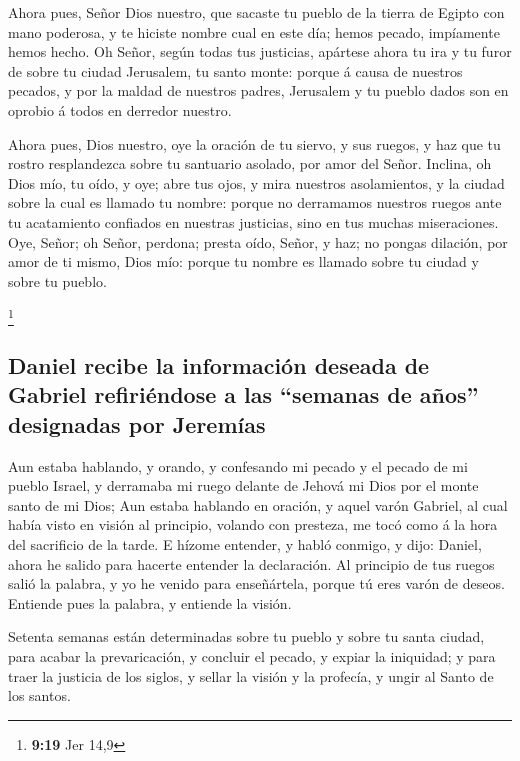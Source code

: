  Ahora pues, Señor Dios nuestro, que sacaste tu pueblo de
la tierra de Egipto con mano poderosa, y te hiciste nombre cual en este
día; hemos pecado, impíamente hemos hecho.  Oh Señor, según
todas tus justicias, apártese ahora tu ira y tu furor de sobre tu ciudad
Jerusalem, tu santo monte: porque á causa de nuestros pecados, y por la
maldad de nuestros padres, Jerusalem y tu pueblo dados son en oprobio á
todos en derredor nuestro.

 Ahora pues, Dios nuestro, oye la oración de tu siervo, y
sus ruegos, y haz que tu rostro resplandezca sobre tu santuario asolado,
por amor del Señor.  Inclina, oh Dios mío, tu oído, y oye;
abre tus ojos, y mira nuestros asolamientos, y la ciudad sobre la cual
es llamado tu nombre: porque no derramamos nuestros ruegos ante tu
acatamiento confiados en nuestras justicias, sino en tus muchas
miseraciones.  Oye, Señor; oh Señor, perdona; presta oído,
Señor, y haz; no pongas dilación, por amor de ti mismo, Dios mío: porque
tu nombre es llamado sobre tu ciudad y sobre tu pueblo.

\footnote{\textbf{9:19} Jer 14,9}

\hypertarget{daniel-recibe-la-informaciuxf3n-deseada-de-gabriel-refiriuxe9ndose-a-las-semanas-de-auxf1os-designadas-por-jeremuxedas}{%
\subsection{Daniel recibe la información deseada de Gabriel refiriéndose
a las ``semanas de años'' designadas por
Jeremías}\label{daniel-recibe-la-informaciuxf3n-deseada-de-gabriel-refiriuxe9ndose-a-las-semanas-de-auxf1os-designadas-por-jeremuxedas}}

 Aun estaba hablando, y orando, y confesando mi pecado y el
pecado de mi pueblo Israel, y derramaba mi ruego delante de Jehová mi
Dios por el monte santo de mi Dios;  Aun estaba hablando en
oración, y aquel varón Gabriel, al cual había visto en visión al
principio, volando con presteza, me tocó como á la hora del sacrificio
de la tarde.  E hízome entender, y habló conmigo, y dijo:
Daniel, ahora he salido para hacerte entender la declaración.
 Al principio de tus ruegos salió la palabra, y yo he
venido para enseñártela, porque tú eres varón de deseos. Entiende pues
la palabra, y entiende la visión.

 Setenta semanas están determinadas sobre tu pueblo y sobre
tu santa ciudad, para acabar la prevaricación, y concluir el pecado, y
expiar la iniquidad; y para traer la justicia de los siglos, y sellar la
visión y la profecía, y ungir al Santo de los santos.

